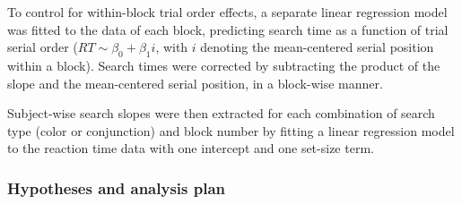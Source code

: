 \documentclass[12pt,twoside]{reedthesis}
\begin{document}
To control for within-block trial order effects, a separate linear regression model was fitted to the data of each block, predicting search time as a function of trial serial order (\(RT \sim \beta_0+\beta_1i\), with \(i\) denoting the mean-centered serial position within a block). Search times were corrected by subtracting the product of the slope and the mean-centered serial position, in a block-wise manner.

Subject-wise search slopes were then extracted for each combination of search type (color or conjunction) and block number by fitting a linear regression model to the reaction time data with one intercept and one set-size term.

\hypertarget{hypotheses-and-analysis-plan}{%
\subsubsection*{Hypotheses and analysis plan}\label{hypotheses-and-analysis-plan}}
\end{document}

